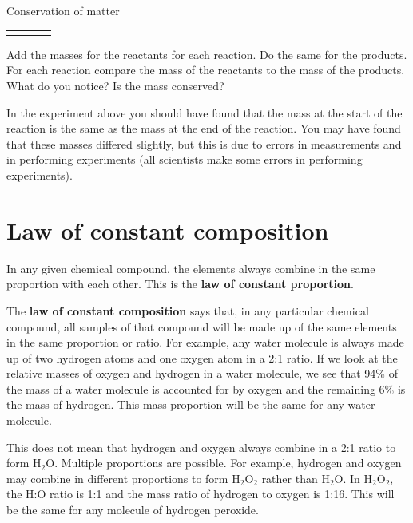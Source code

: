 \begin{g_experiment}{Conservation of matter}
\begin{table}[H]
\begin{center}
\begin{xtabular}[t]{|l|l|l|l|}
         &
         &
     \tabularnewline{}
    \end{xtabular}
      \end{center}
\end{table}
    \par
  \label{m38711*eip-634}Add the masses for the reactants for each reaction. Do the same for the products. For each reaction compare the mass of the reactants to the mass of the products. What do you notice? Is the mass conserved?\par \label{m38711*eip-65}In the experiment above you should have found that the mass at the start of the reaction is the same as the mass at the end of the reaction. You may have found that these masses differed slightly, but this is due to errors in measurements and in performing experiments (all scientists make some errors in performing experiments).  \par
\end{g_experiment} 
    \label{m38711*cid6}
            \section{Law of constant composition}
            \nopagebreak
      \label{m38711*id65065}In any given chemical compound, the elements always combine in the same proportion with each other. This is the \textbf{law of constant proportion}.\par 
      \label{m38711*id65075}The \textbf{law of constant composition} says that, in any particular chemical compound, all samples of that compound will be made up of the same elements in the same proportion or ratio. For example, any water molecule is always made up of two hydrogen atoms and one oxygen atom in a 2:1 ratio. If we look at the relative masses of oxygen and hydrogen in a water molecule, we see that 94\% of the mass of a water molecule is accounted for by oxygen and the remaining 6\% is the mass of hydrogen. This mass proportion will be the same for any water molecule.\par 
      \label{m38711*id65089}This does not mean that hydrogen and oxygen always combine in a 2:1 ratio to form $\mathrm{H}{}_{2}\mathrm{O}$. Multiple proportions are possible. For example, hydrogen and oxygen may combine in different proportions to form $\mathrm{H}{}_{2}\mathrm{O}{}_{2}$ rather than $\mathrm{H}{}_{2}\mathrm{O}$. In $\mathrm{H}{}_{2}\mathrm{O}{}_{2}$, the H:O ratio is 1:1 and the mass ratio of hydrogen to oxygen is 1:16. This will be the same for any molecule of hydrogen peroxide.\par 
    \label{m38711*cid7}
